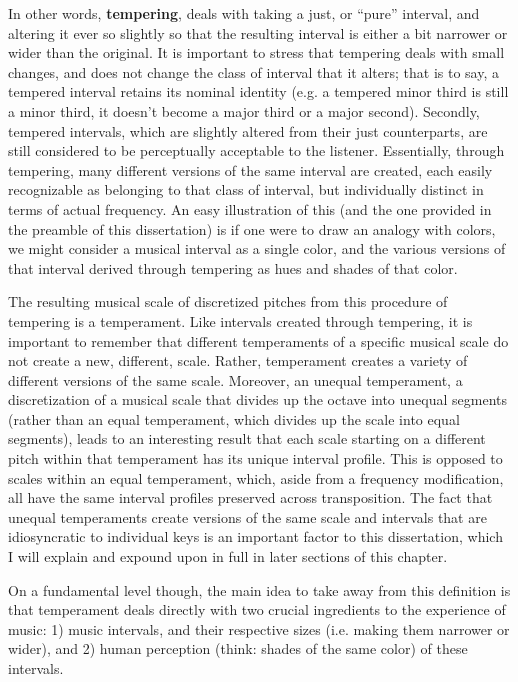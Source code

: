In other words, \textbf{tempering}, deals with taking a just, or
``pure'' interval, and altering it ever so slightly so that the
resulting interval is either a bit narrower or wider than the original.
It is important to stress that tempering deals with small changes, and
does not change the class of interval that it alters; that is to say, a
tempered interval retains its nominal identity (e.g. a tempered minor
third is still a minor third, it doesn't become a major third or a major
second). Secondly, tempered intervals, which are slightly altered from
their just counterparts, are still considered to be perceptually
acceptable to the listener. Essentially, through tempering, many
different versions of the same interval are created, each easily
recognizable as belonging to that class of interval, but individually
distinct in terms of actual frequency. An easy illustration of this (and
the one provided in the preamble of this dissertation) is if one were to
draw an analogy with colors, we might consider a musical interval as a
single color, and the various versions of that interval derived through
tempering as hues and shades of that color.

The resulting musical scale of discretized pitches from this procedure
of tempering is a temperament. Like intervals created through tempering,
it is important to remember that different temperaments of a specific
musical scale do not create a new, different, scale. Rather, temperament
creates a variety of different versions of the same scale. Moreover, an
unequal temperament, a discretization of a musical scale that divides up
the octave into unequal segments (rather than an equal temperament,
which divides up the scale into equal segments), leads to an interesting
result that each scale starting on a different pitch within that
temperament has its unique interval profile. This is opposed to scales
within an equal temperament, which, aside from a frequency modification,
all have the same interval profiles preserved across transposition. The
fact that unequal temperaments create versions of the same scale and
intervals that are idiosyncratic to individual keys is an important
factor to this dissertation, which I will explain and expound upon in
full in later sections of this chapter.

On a fundamental level though, the main idea to take away from this
definition is that temperament deals directly with two crucial
ingredients to the experience of music: 1) music intervals, and their
respective sizes (i.e. making them narrower or wider), and 2) human
perception (think: shades of the same color) of these intervals.

